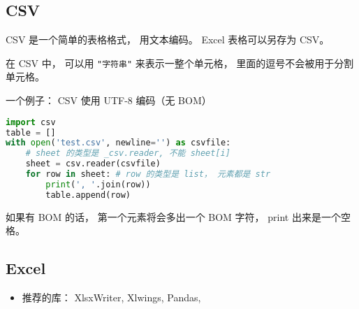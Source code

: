 
\begin{issues}
\issueDraft
\end{issues}


\subsection{CSV}
CSV 是一个简单的表格格式， 用文本编码。 Excel 表格可以另存为 CSV。

在 CSV 中， 可以用 \verb|"字符串"| 来表示一整个单元格， 里面的逗号不会被用于分割单元格。



一个例子： CSV 使用 UTF-8 编码（无 BOM）
\begin{lstlisting}[language=python]
import csv
table = []
with open('test.csv', newline='') as csvfile:
    # sheet 的类型是 _csv.reader, 不能 sheet[i]
    sheet = csv.reader(csvfile)
    for row in sheet: # row 的类型是 list， 元素都是 str
        print(', '.join(row))
        table.append(row)
\end{lstlisting}
如果有 BOM 的话， 第一个元素将会多出一个 BOM 字符， print 出来是一个空格。

\subsection{Excel}
\begin{itemize}
\item 推荐的库： XlsxWriter, Xlwings, Pandas, 
\end{itemize}
